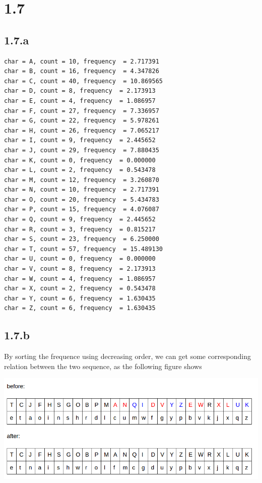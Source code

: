 \documentclass{article}
\begin{document}
\section{1.7}

\subsection{1.7.a}
\begin{lstlisting}
char = A, count = 10, frequency  = 2.717391
char = B, count = 16, frequency  = 4.347826
char = C, count = 40, frequency  = 10.869565
char = D, count = 8, frequency  = 2.173913
char = E, count = 4, frequency  = 1.086957
char = F, count = 27, frequency  = 7.336957
char = G, count = 22, frequency  = 5.978261
char = H, count = 26, frequency  = 7.065217
char = I, count = 9, frequency  = 2.445652
char = J, count = 29, frequency  = 7.880435
char = K, count = 0, frequency  = 0.000000
char = L, count = 2, frequency  = 0.543478
char = M, count = 12, frequency  = 3.260870
char = N, count = 10, frequency  = 2.717391
char = O, count = 20, frequency  = 5.434783
char = P, count = 15, frequency  = 4.076087
char = Q, count = 9, frequency  = 2.445652
char = R, count = 3, frequency  = 0.815217
char = S, count = 23, frequency  = 6.250000
char = T, count = 57, frequency  = 15.489130
char = U, count = 0, frequency  = 0.000000
char = V, count = 8, frequency  = 2.173913
char = W, count = 4, frequency  = 1.086957
char = X, count = 2, frequency  = 0.543478
char = Y, count = 6, frequency  = 1.630435
char = Z, count = 6, frequency  = 1.630435
\end{lstlisting}

\subsection{1.7.b}

By sorting the frequence using decreasing order, we can get some corresponding relation between the two sequence,
as the following figure shows

\begin{center}
\includegraphics[scale=0.3]{fig2.png}
\end{center}
\end{document}
